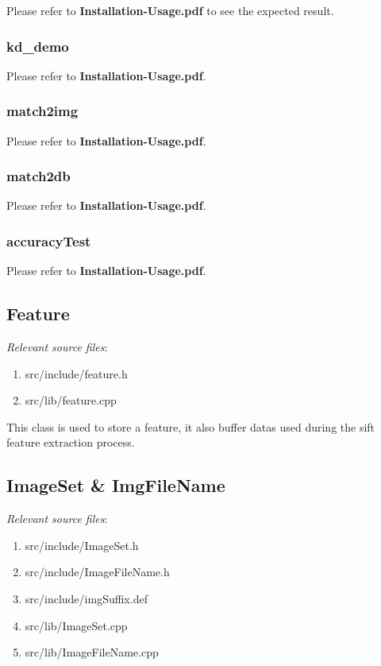 \documentclass[paper=a4, fontsize=11pt]{scrartcl} %
\numberwithin{equation}{section} %
\numberwithin{figure}{section} %
\numberwithin{table}{section} %
\begin{document}
Please refer to \textbf{Installation-Usage.pdf} to see the expected result.

\subsubsection{kd\_demo}

Please refer to \textbf{Installation-Usage.pdf}.

\subsubsection{match2img}

Please refer to \textbf{Installation-Usage.pdf}.

\subsubsection{match2db}

Please refer to \textbf{Installation-Usage.pdf}.

\subsubsection{accuracyTest}

Please refer to \textbf{Installation-Usage.pdf}.

\subsection{Feature} \label{sec-feature}

\textsl{Relevant source files}: 

\begin{enumerate}
    \item src/include/feature.h
    \item src/lib/feature.cpp
\end{enumerate}

This class is used to store a feature, it also buffer datas used during the sift feature extraction process.\\

\subsection{ImageSet \& ImgFileName}\label{sec-file}

\textsl{Relevant source files}: 

\begin{enumerate}
    \item src/include/ImageSet.h
    \item src/include/ImageFileName.h
    \item src/include/imgSuffix.def
    \item src/lib/ImageSet.cpp
    \item src/lib/ImageFileName.cpp
\end{enumerate}
\end{document}

